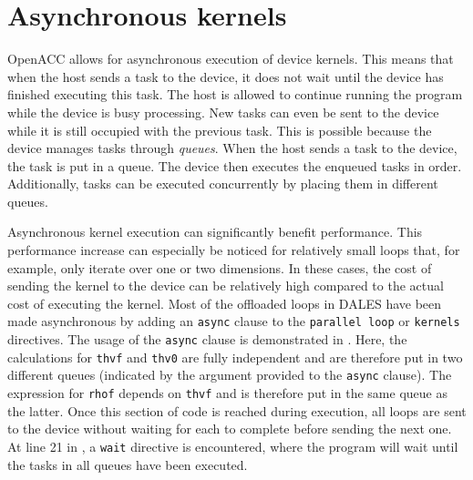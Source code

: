

\section{Asynchronous kernels}
OpenACC allows for asynchronous execution of device kernels. This means that when the host sends a task to the device, it does not wait until the device has finished executing this task. The host is allowed to continue running the program while the device is busy processing. New tasks can even be sent to the device while it is still occupied with the previous task. This is possible because the device manages tasks through \emph{queues}. When the host sends a task to the device, the task is put in a queue. The device then executes the enqueued tasks in order. Additionally, tasks can be executed concurrently by placing them in different queues.

Asynchronous kernel execution can significantly benefit performance. This performance increase can especially be noticed for relatively small loops that, for example, only iterate over one or two dimensions. In these cases, the cost of sending the kernel to the device can be relatively high compared to the actual cost of executing the kernel. Most of the offloaded loops in DALES have been made asynchronous by adding an \texttt{async} clause to the \texttt{parallel loop} or \texttt{kernels} directives. The usage of the \texttt{async} clause is demonstrated in . Here, the calculations for \texttt{thvf} and \texttt{thv0} are fully independent and are therefore put in two different queues (indicated by the argument provided to the \texttt{async} clause). The expression for \texttt{rhof} depends on \texttt{thvf} and is therefore put in the same queue as the latter. Once this section of code is reached during execution, all loops are sent to the device without waiting for each to complete before sending the next one. At line 21 in , a \texttt{wait} directive is encountered, where the program will wait until the tasks in all queues have been executed.

